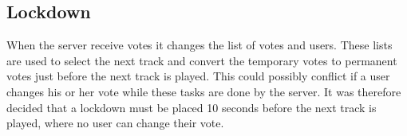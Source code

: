 \subsection{Lockdown}
When the server receive votes it changes the list of votes and users. These lists are used to select the next track and convert the temporary votes to permanent votes just before the next track is played. This could possibly conflict if a user changes his or her vote while these tasks are done by the server. It was therefore decided that a lockdown must be placed 10 seconds before the next track is played, where no user can change their vote.